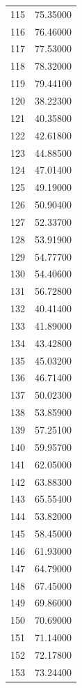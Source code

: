 \documentclass[
  letterpaper,
  DIV=11,
  numbers=noendperiod]{scrreprt}
\begin{document}
\begin{tcolorbox}
\begin{tabular}{lr}
115  &         75.35000 \\
116  &         76.46000 \\
117  &         77.53000 \\
118  &         78.32000 \\
119  &         79.44100 \\
120  &         38.22300 \\
121  &         40.35800 \\
122  &         42.61800 \\
123  &         44.88500 \\
124  &         47.01400 \\
125  &         49.19000 \\
126  &         50.90400 \\
127  &         52.33700 \\
128  &         53.91900 \\
129  &         54.77700 \\
130  &         54.40600 \\
131  &         56.72800 \\
132  &         40.41400 \\
133  &         41.89000 \\
134  &         43.42800 \\
135  &         45.03200 \\
136  &         46.71400 \\
137  &         50.02300 \\
138  &         53.85900 \\
139  &         57.25100 \\
140  &         59.95700 \\
141  &         62.05000 \\
142  &         63.88300 \\
143  &         65.55400 \\
144  &         53.82000 \\
145  &         58.45000 \\
146  &         61.93000 \\
147  &         64.79000 \\
148  &         67.45000 \\
149  &         69.86000 \\
150  &         70.69000 \\
151  &         71.14000 \\
152  &         72.17800 \\
153  &         73.24400 \\

\end{tabular}
\end{tcolorbox}
\end{document}

